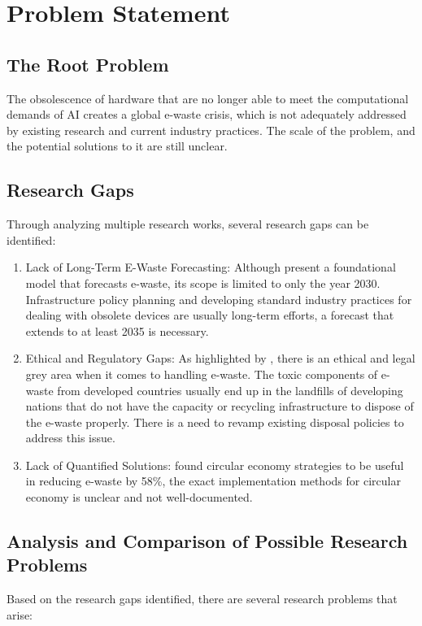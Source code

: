 \documentclass[a4paper, 12pt]{article}
\begin{document}
\section{Problem Statement}
\subsection*{The Root Problem}
The obsolescence of hardware that are no longer able to meet the computational demands of AI creates a global e-waste crisis, which is not adequately addressed by existing research and current industry practices. The scale of the problem, and the potential solutions to it are still unclear.

\subsection*{Research Gaps}
Through analyzing multiple research works, several research gaps can be identified: 
\begin{enumerate} 
	\item Lack of Long-Term E-Waste Forecasting: Although \citet{wang_2024_ewaste} present a foundational model that forecasts e-waste, its scope is limited to only the year 2030. Infrastructure policy planning and developing standard industry practices for dealing with obsolete devices are usually long-term efforts, a forecast that extends to at least 2035 is necessary. 
	
	\item Ethical and Regulatory Gaps: As highlighted by \citet{Zhuk2023}, there is an ethical and legal grey area when it comes to handling e-waste. The toxic components of e-waste from developed countries usually end up in the landfills of developing nations that do not have the capacity or recycling infrastructure to dispose of the e-waste properly. There is a need to revamp existing disposal policies to address this issue.
	
	\item Lack of Quantified Solutions: \citet{wang_2024_ewaste} found circular economy strategies to be useful in reducing e-waste by 58\%, the exact implementation methods for circular economy is unclear and not well-documented.
\end{enumerate}

\subsection*{Analysis and Comparison of Possible Research Problems}
Based on the research gaps identified, there are several research problems that arise: 
\end{document}
